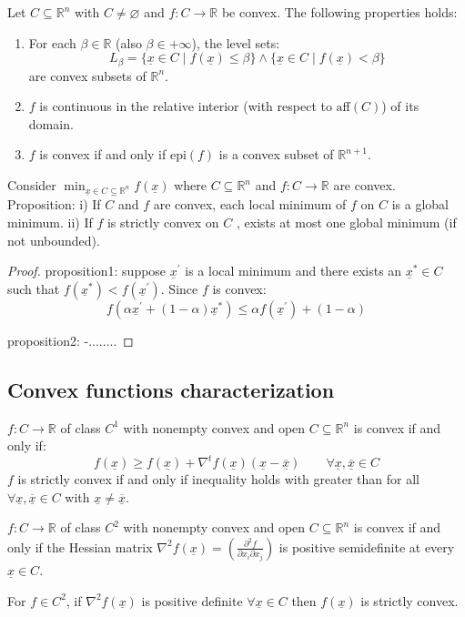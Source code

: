 Let $C \subseteq \mathbb{R}^n$ with $C \neq \varnothing$ and $f : C \rightarrow\mathbb{R}$ be convex.
The following properties holds: 
\begin{enumerate}
    \item For each $β \in\mathbb{R}$ (also $\beta\in + \infty$), the level sets:
        \[L_{\beta} = \{\underline{x} \in C \mid f (\underline{x}) \leq \beta\} \land \{\underline{x} \in C \mid f (\underline{x}) <\beta\}\]
        are convex subsets of $\mathbb{R}^n$.
    \item $f$ is continuous in the relative interior (with respect to $\text{aﬀ}(C)$) of its domain.
    \item $f$ is convex if and only if $\text{epi}(f)$ is a convex subset of $\mathbb{R}^{n+1}$. 
\end{enumerate}
Consider $\min_{\underline{x}\in C \subseteq\mathbb{R}^n} f(\underline{x})$ where $C \subseteq\mathbb{R}^n$ and $f : C \rightarrow\mathbb{R}$ are convex.
Proposition:
i) If $C$ and $f$ are convex, each local minimum of $f$ on $C$ is a global minimum.
ii) If $f$ is strictly convex on $C$ , exists at most one global minimum (if not unbounded).
\begin{proof}
    proposition1: suppose $\underline{x}^\prime$ is a local minimum and there exists an $\underline{x}^\ast\in C$ such that $f(\underline{x}^\ast)< f(\underline{x}^\prime)$. 
    Since $f$ is convex: 
    \[f(\alpha \underline{x}^\prime +(1-\alpha)\underline{x}^\ast)\leq \alpha f( \underline{x}^\prime)+ (1-\alpha)\]

    proposition2: -........
\end{proof}

\subsection{Convex functions characterization}
\begin{proposition}
    $f : C \rightarrow\mathbb{R}$ of class $C^1$ with nonempty convex and open $C \subseteq\mathbb{R}^n$ is convex if and only if: 
    \[f(\underline{x}) \geq f (\underline{x}) +  \nabla ^t f (\underline{x})(\underline{x}-\underline{\overline{x}}) \qquad\forall \underline{x},\underline{\overline{x}} \in C\]
    $f$ is strictly convex if and only if inequality holds with greater than for all $\forall \underline{x},\underline{\overline{x}} \in C$ with $\underline{x}\neq\underline{\overline{x}}$.
\end{proposition}

\begin{proposition}
    $f : C \rightarrow\mathbb{R}$ of class $C^2$ with nonempty convex and open $C \subseteq\mathbb{R}^n$ is
convex if and only if the Hessian matrix $\nabla^2 f(\underline{x}) = \left( \frac{\partial^2f}{\partial x_i \partial x_j }\right)$ is positive
semidefinite at every $\underline{x}\in C$.

\end{proposition}
For $f \in C^2$, if $\nabla^2f (\underline{x})$ is positive definite $\forall\underline{x}\in C$ then $f (\underline{x})$ is strictly convex.


